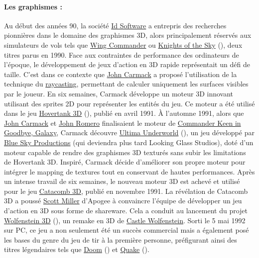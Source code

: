 \documentclass[12pt]{report}
\begin{document}
\paragraph{Les graphismes :}
Au début des années 90, la société \href{https://fr.wikipedia.org/wiki/Id_Software}{Id Software} a entrepris des 
recherches pionnières dans le domaine des graphismes 3D, alors principalement réservés aux simulateurs de vols tels 
que \href{https://fr.wikipedia.org/wiki/Wing_Commander_(jeu_vid%C3%A9o)}{Wing Commander} ou 
\href{https://en.wikipedia.org/wiki/Knights_of_the_Sky}{Knights of the Sky} (), deux titres parus en 1990. Face aux 
contraintes de performance des ordinateurs de l'époque, le développement de jeux d'action en 3D rapide représentait 
un défi de taille. C'est dans ce contexte que \href{https://fr.wikipedia.org/wiki/John_Carmack}{John Carmack} a 
proposé l'utilisation de la technique du \href{https://fr.wikipedia.org/wiki/Raycasting}{raycasting}, permettant 
de calculer uniquement les surfaces visibles par le joueur. En six semaines, Carmack développe un moteur 3D innovant 
utilisant des sprites 2D pour représenter les entités du jeu. Ce moteur a été utilisé dans le jeu 
\href{https://fr.wikipedia.org/wiki/Hovertank_3D}{Hovertank 3D} (), publié en avril 1991.
À l'automne 1991, alors que \href{https://fr.wikipedia.org/wiki/John_Carmack}{John Carmack} et 
\href{https://fr.wikipedia.org/wiki/John_Romero}{John Romero} finalisaient le moteur de 
\href{https://en.wikipedia.org/wiki/Commander_Keen_in_Goodbye,_Galaxy}{Commander Keen in Goodbye, Galaxy}, Carmack 
découvre \href{https://fr.wikipedia.org/wiki/Ultima_Underworld}{Ultima Underworld} (), un jeu développé par 
\href{https://fr.wikipedia.org/wiki/Looking_Glass_Studios}{Blue Sky Productions} (qui deviendra plus tard Looking Glass Studios), 
doté d'un moteur capable de rendre des graphismes 3D texturés sans subir les limitations de Hovertank 3D.
Inspiré, Carmack décide d'améliorer son propre moteur pour 
intégrer le mapping de textures tout en conservant de hautes performances. Après un intense travail de six semaines, 
le nouveau moteur 3D est achevé et utilisé pour le jeu \href{https://fr.wikipedia.org/wiki/Catacomb_3D}{Catacomb 3D},
publié en novembre 1991. La révélation de Catacomb 3D a poussé 
\href{https://fr.wikipedia.org/wiki/Scott_Miller_(programmeur)}{Scott Miller} d'Apogee à convaincre l'équipe de 
développer un jeu d'action en 3D sous forme de shareware. Cela a conduit au lancement du projet 
\href{https://fr.wikipedia.org/wiki/Wolfenstein_3D}{Wolfenstein 3D} (), un remake en 3D de 
\href{https://fr.wikipedia.org/wiki/Castle_Wolfenstein}{Castle Wolfenstein}. Sorti le 5 mai 1992 sur PC, ce jeu a 
non seulement été un succès commercial mais a également posé les bases du genre du jeu de tir à la première personne, 
préfigurant ainsi des titres légendaires tels que 
\href{https://fr.wikipedia.org/wiki/Doom_(jeu_vid%C3%A9o,_1993)}{Doom} (\nameref{fig:doom_1993}) et 
\href{https://fr.wikipedia.org/wiki/Quake}{Quake} ().
\end{document}
